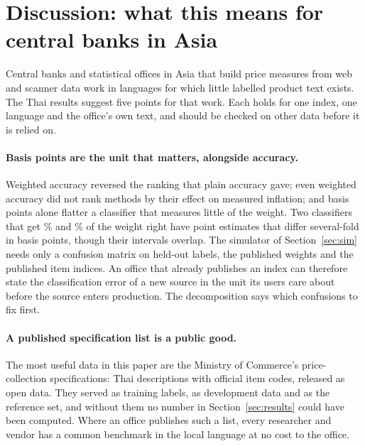 \section{Discussion: what this means for central banks in Asia}\label{sec:discussion}

Central banks and statistical offices in Asia that build price measures from web and
scanner data work in languages for which little labelled product text exists. The Thai results
suggest five points for that work. Each holds for one index, one language and the office's
own text, and should be checked on other data before it is relied on.

\paragraph{Basis points are the unit that matters, alongside accuracy.} Weighted accuracy reversed the ranking that
plain accuracy gave; even weighted accuracy did not rank methods by their effect on
measured inflation; and basis points alone flatter a classifier that measures little of the
weight. Two classifiers that get \AccWEfiveMLP\% and \AccWBgeMLP\% of the weight right have point
estimates that differ several-fold in basis points, though their intervals overlap. The simulator of Section~\ref{sec:sim} needs only a
confusion matrix on held-out labels, the published weights and the published item indices.
An office that already publishes an index can therefore state the
classification error of a new source in the unit its users care about before the source
enters production. The decomposition says which confusions to fix first.

\paragraph{A published specification list is a public good.} The most useful data in this
paper are the Ministry of Commerce's price-collection specifications: Thai descriptions with
official item codes, released as open data. They served as training labels, as development
data and as the reference set, and without them no number in Section~\ref{sec:results}
could have been computed. Where an office publishes such a list, every researcher and vendor
has a common benchmark in the local language at no cost to the office.

